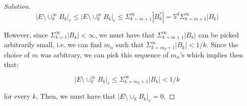 \documentclass[10pt]{article}
\begin{document}
\begin{proof}[Solution]
$$ \left| E \setminus \cup_k^\infty B_k \right|_e \leq \left| E \setminus \cup_k^m B_k \right|_e \leq \Sigma_{k=m+1}^\infty|B_k^*|  = 5^d \Sigma_{k=m+1}^\infty |B_k|$$

However, since $\Sigma_{k=1}^\infty |B_k| < \infty$, we must have that $ \Sigma_{k=m+1}^\infty |B_k|$ can be picked arbitrarily small, i.e. we can find $m_n$ such that $ \Sigma_{k=m_k+1}^\infty |B_k| < 1/k$. Since the choice of $m$ was arbitrary, we can pick this sequence of $m_n$'s which implies then that:

$$ \left| E \setminus \cup_k^\infty B_k \right|_e \leq  \Sigma_{k=m_k+1}^\infty |B_k| < 1/k $$

for every $k$. Then, we must have that $\left| E \setminus \cup_k B_k \right|_e = 0$.

\end{proof}

 
\end{document}
